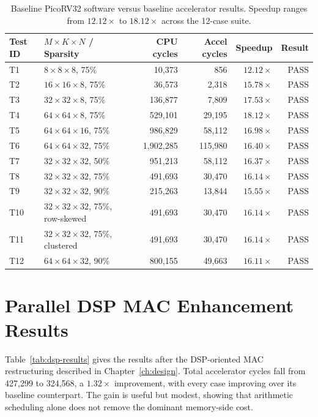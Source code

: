 \begin{table}[htbp]
  \centering
  \small
  \begin{tabular}{lp{4.2cm}rrrr}
  \toprule
  Test ID & $M \times K \times N$ / Sparsity & CPU cycles & Accel cycles & Speedup & Result \\
  \midrule
  T1  & $8 \times 8 \times 8$, 75\%    & 10,373   &    856 & $12.12\times$ & PASS \\
  T2  & $16 \times 16 \times 8$, 75\%  & 36,573   &  2,318 & $15.78\times$ & PASS \\
  T3  & $32 \times 32 \times 8$, 75\%  & 136,877  &  7,809 & $17.53\times$ & PASS \\
  T4  & $64 \times 64 \times 8$, 75\%  & 529,101  & 29,195 & $18.12\times$ & PASS \\
  T5  & $64 \times 64 \times 16$, 75\% & 986,829  & 58,112 & $16.98\times$ & PASS \\
  T6  & $64 \times 64 \times 32$, 75\% & 1,902,285 & 115,980 & $16.40\times$ & PASS \\
  T7  & $32 \times 32 \times 32$, 50\% & 951,213  & 58,112 & $16.37\times$ & PASS \\
  T8  & $32 \times 32 \times 32$, 75\% & 491,693  & 30,470 & $16.14\times$ & PASS \\
  T9  & $32 \times 32 \times 32$, 90\% & 215,263  & 13,844 & $15.55\times$ & PASS \\
  T10 & $32 \times 32 \times 32$, 75\%, row-skewed & 491,693 & 30,470 & $16.14\times$ & PASS \\
  T11 & $32 \times 32 \times 32$, 75\%, clustered  & 491,693 & 30,470 & $16.14\times$ & PASS \\
  T12 & $64 \times 64 \times 32$, 90\% & 800,155  & 49,663 & $16.11\times$ & PASS \\
  \bottomrule
  \end{tabular}
  \caption{Baseline PicoRV32 software versus baseline accelerator results.
           Speedup ranges from $12.12\times$ to $18.12\times$ across the
           12-case suite.}
  \label{tab:baseline-results}
\end{table}

\vspace{8cm}

\section{Parallel DSP MAC Enhancement Results}

Table~\ref{tab:dsp-results} gives the results after the DSP-oriented
MAC restructuring described in Chapter~\ref{ch:design}. Total
accelerator cycles fall from 427,299 to 324,568, a $1.32\times$
improvement, with every case improving over its baseline counterpart.
The gain is useful but modest, showing that arithmetic scheduling alone
does not remove the dominant memory-side cost.

